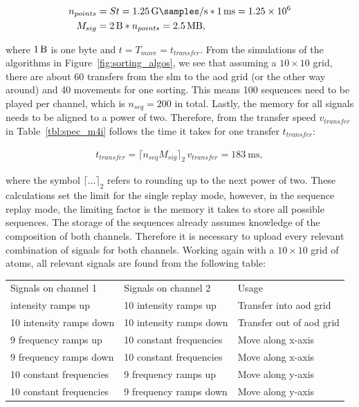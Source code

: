 \begin{align}
	n_{points} &= S t = \SI{1.25}{\giga\samples\per\second} * \SI{1}{\milli\second} = \num{1.25e6} \\
	M_{sig} &= \SI{2}{\byte} * n_{points} = \SI{2.5}{\mega\byte},
\end{align}

where $\SI{1}{\byte}$ is one byte and $t=T_{move}=t_{transfer}$. From the simulations of the algorithms in Figure~\ref{fig:sorting_algos}, we see that assuming a $10\times10$ grid, there are about 60 transfers from the \ac{slm} to the \ac{aod} grid (or the other way around) and 40 movements for one sorting. This means 100 sequences need to be played per channel, which is $n_{seq}=200$ in total. Lastly, the memory for all signals needs to be aligned to a power of two. Therefore, from the transfer speed $v_{transfer}$ in Table~\ref{tbl:spec_m4i} follows the time it takes for one transfer $t_{transfer}$:

\begin{align}
	t_{transfer} = \lceil n_{seq} M_{sig}\rceil_2\, v_{transfer} = \SI{183}{\milli\second},
\end{align}

where the symbol $\lceil \ldots \rceil_2$ refers to rounding up to the next power of two.
These calculations set the limit for the single replay mode, however, in the sequence replay mode, the limiting factor is the memory it takes to store all possible sequences. The storage of the sequences already assumes knowledge of the composition of both channels. Therefore it is necessary to upload every relevant combination of signals for both channels. Working again with a $10\times10$ grid of atoms, all relevant signals are found from the following table:

\begin{center}
\begin{tabular}{l l l}
	\toprule \toprule
		Signals on channel 1 & Signals on channel 2 & Usage \\ \thickhline%
		10 intensity ramps up & 10 intensity ramps up & Transfer into \ac{aod} grid \\
		10 intensity ramps down & 10 intensity ramps down & Transfer out of \ac{aod} grid \\
		9 frequency ramps up & 10 constant frequencies & Move along x-axis \\
		9 frequency ramps down & 10 constant frequencies & Move along x-axis \\
		10 constant frequencies & 9 frequency ramps up & Move along y-axis \\
		10 constant frequencies & 9 frequency ramps down & Move along y-axis \\
	\bottomrule \bottomrule
\end{tabular}
\end{center}

